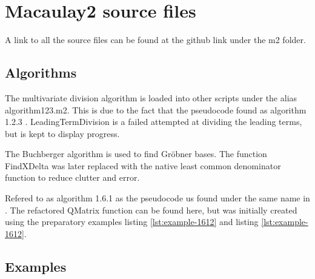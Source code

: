\section{Macaulay2 source files}

A link to all the source files can be found at the github link \cite{Github} under the m2 folder.

\subsection{Algorithms}
\label{app:algorithms}



The multivariate division algorithm is loaded into other scripts under the alias algorithm123.m2. This is due to the fact that the pseudocode found as algorithm 1.2.3 \cite{Applied}. LeadingTermDivision is a failed attempted at dividing the leading terms, but is kept to display progress. 



The Buchberger algorithm is used to find Gröbner bases. The function FindXDelta was later replaced with the native least common denominator function to reduce clutter and error.


Refered to as algorithm 1.6.1 as the pseudocode us found under the same name in \cite{Applied}. The refactored QMatrix function can be found here, but was initially created using the preparatory examples listing \ref{lst:example-1612} and listing \ref{lst:example-1612}.

\newpage

\subsection{Examples}
\label{app:examples}





